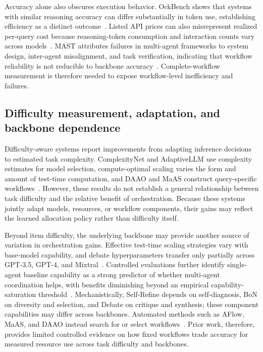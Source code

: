 \documentclass[a4paper]{article}
\theoremstyle{plain}
\theoremstyle{definition}
\theoremstyle{remark}
\begin{document}
Accuracy alone also obscures execution behavior.
OckBench shows that systems with similar reasoning accuracy can differ substantially in token use, establishing efficiency as a distinct outcome~\citep{du_ockbench_2026}.
Listed API prices can also misrepresent realized per-query cost because reasoning-token consumption and interaction counts vary across models~\citep{chen_price_2026}.
MAST attributes failures in multi-agent frameworks to system design, inter-agent misalignment, and task verification, indicating that workflow reliability is not reducible to backbone accuracy~\citep{cemri_why_2025}.
Complete-workflow measurement is therefore needed to expose workflow-level inefficiency and failures.

\subsection{Difficulty measurement, adaptation, and backbone dependence}

Difficulty-aware systems report improvements from adapting inference decisions to estimated task complexity.
ComplexityNet and AdaptiveLLM use complexity estimates for model selection, compute-optimal scaling varies the form and amount of test-time computation, and DAAO and MaAS construct query-specific workflows~\citep{bae_complexitynet_2023,cheng_adaptivellm_2025,snell_scaling_2025,su_difficulty-aware_2026,zhang_multi-agent_2025}.
However, these results do not establish a general relationship between task difficulty and the relative benefit of orchestration.
Because these systems jointly adapt models, resources, or workflow components, their gains may reflect the learned allocation policy rather than difficulty itself.

Beyond item difficulty, the underlying backbone may provide another source of variation in orchestration gains.
Effective test-time scaling strategies vary with base-model capability, and debate hyperparameters transfer only partially across GPT-3.5, GPT-4, and Mixtral~\citep{snell_scaling_2025,smit_should_2024}.
Controlled evaluations further identify single-agent baseline capability as a strong predictor of whether multi-agent coordination helps, with benefits diminishing beyond an empirical capability-saturation threshold~\citep{kim_capable_2026}.
Mechanistically, Self-Refine depends on self-diagnosis, BoN on diversity and selection, and Debate on critique and synthesis; these component capabilities may differ across backbones.
Automated methods such as AFlow, MaAS, and DAAO instead search for or select workflows~\citep{zhang_multi-agent_2025,su_difficulty-aware_2026,zhang_aflow_2025}.
Prior work, therefore, provides limited controlled evidence on how fixed workflows trade accuracy for measured resource use across task difficulty and backbones.
\end{document}
